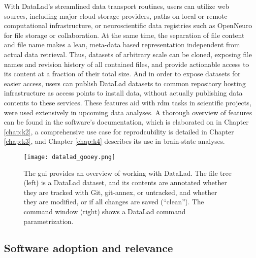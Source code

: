 {With DataLad's streamlined data transport routines, users can utilize web sources, including major cloud storage providers, paths on local or remote computational infrastructure, or neuroscientific data registries such as OpenNeuro \citep{markiewicz2021openneuro} for file storage or collaboration.
At the same time, the separation of file content and file name makes a lean, meta-data based representation independent from actual data retrieval.
Thus, datasets of arbitrary scale can be cloned, exposing file names and revision history of all contained files, and provide actionable access to its content at a fraction of their total size.
And in order to expose datasets for easier access, users can publish DataLad datasets to common repository hosting infrastructure as access points to install data, without actually publishing data contents to these services.
These features aid with \gls{rdm} tasks in scientific projects, were used extensively in upcoming data analyses.
A thorough overview of features can be found in the software's documentation, which is elaborated on in Chapter \ref{chap:k2},  a comprehensive use case for reprodcubility is detailed in Chapter \ref{chap:k3}, and Chapter \ref{chap:k4} describes its use in brain-state analyses.

\begin{figure}
	\centering
	\texttt{[image: datalad\_gooey.png]}
	\caption[DataLad: Graphical User Interface]{The \gls{gui} provides an overview of working with DataLad. The file tree (left) is a DataLad dataset, and its contents are annotated whether they are tracked with Git, git-annex, or untracked, and whether they are modified, or if all changes are saved (``clean''). The command window (right) shows a DataLad command parametrization.}
	\label{fig:gooey}
\end{figure}

\subsection{Software adoption and relevance}

}
